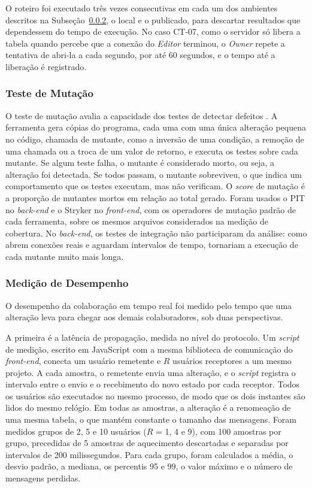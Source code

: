 O roteiro foi executado três vezes consecutivas em cada um dos ambientes descritos na Subseção~\ref{subsec:medicao-desempenho}, o local e o publicado, para descartar resultados que dependessem do tempo de execução. No caso CT-07, como o servidor só libera a tabela quando percebe que a conexão do \textit{Editor} terminou, o \textit{Owner} repete a tentativa de abri-la a cada segundo, por até 60 segundos, e o tempo até a liberação é registrado.

\subsubsection{Teste de Mutação}
O teste de mutação avalia a capacidade dos testes de detectar defeitos \cite{DeMillo1978}. A ferramenta gera cópias do programa, cada uma com uma única alteração pequena no código, chamada de mutante, como a inversão de uma condição, a remoção de uma chamada ou a troca de um valor de retorno, e executa os testes sobre cada mutante. Se algum teste falha, o mutante é considerado morto, ou seja, a alteração foi detectada. Se todos passam, o mutante sobreviveu, o que indica um comportamento que os testes executam, mas não verificam. O \textit{score} de mutação é a proporção de mutantes mortos em relação ao total gerado. Foram usados o PIT no \textit{back-end} e o Stryker no \textit{front-end}, com os operadores de mutação padrão de cada ferramenta, sobre os mesmos arquivos considerados na medição de cobertura. No \textit{back-end}, os testes de integração não participaram da análise: como abrem conexões reais e aguardam intervalos de tempo, tornariam a execução de cada mutante muito mais longa.

\subsubsection{Medição de Desempenho}
\label{subsec:medicao-desempenho}
O desempenho da colaboração em tempo real foi medido pelo tempo que uma alteração leva para chegar aos demais colaboradores, sob duas perspectivas.

A primeira é a latência de propagação, medida no nível do protocolo. Um \textit{script} de medição, escrito em JavaScript com a mesma biblioteca de comunicação do \textit{front-end}, conecta um usuário remetente e $R$ usuários receptores a um mesmo projeto. A cada amostra, o remetente envia uma alteração, e o \textit{script} registra o intervalo entre o envio e o recebimento do novo estado por cada receptor. Todos os usuários são executados no mesmo processo, de modo que os dois instantes são lidos do mesmo relógio. Em todas as amostras, a alteração é a renomeação de uma mesma tabela, o que mantém constante o tamanho das mensagens. Foram medidos grupos de 2, 5 e 10 usuários ($R$ = 1, 4 e 9), com 100 amostras por grupo, precedidas de 5 amostras de aquecimento descartadas e separadas por intervalos de 200 milissegundos. Para cada grupo, foram calculados a média, o desvio padrão, a mediana, os percentis 95 e 99, o valor máximo e o número de mensagens perdidas.

